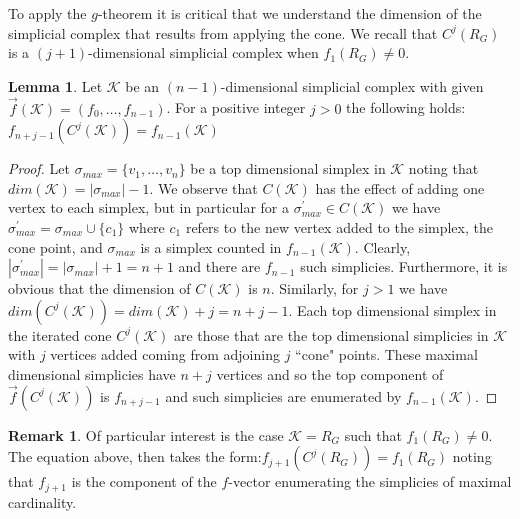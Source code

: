 \documentclass[oneside,12pt]{amsart}
\theoremstyle{definition}
\newtheorem{Lemma}[Theorem]{Lemma}
\newtheorem{Remark}[Theorem]{Remark}
\numberwithin{equation}{section}
\begin{document}
To apply the $g$-theorem it is critical that we understand the dimension of the simplicial complex that results from applying the cone.  We recall that $C^j(R_G)$ is a $(j+1)$-dimensional simplicial complex when $f_1(R_G) \neq 0$.


\begin{Lemma}\label{f vector cone}
Let $\mathcal{K}$ be an $(n-1)$-dimensional simplicial complex with given $\overrightarrow{f}(\mathcal{K}) = (f_0,\ldots,f_{n-1})$.  For a positive integer $j > 0$ the following holds: $f_{n+j -1}(C^j(\mathcal{K})) = f_{n-1}(\mathcal{K})$\\
\end{Lemma}


\begin{proof}
Let $\sigma_{max} = \{v_1,\ldots,v_n\}$ be a top dimensional simplex in $\mathcal{K}$ noting that $dim(\mathcal{K}) = |  \sigma_{max} | -1$.    We observe that $C(\mathcal{K})$ has the effect of adding one vertex to each simplex, but in particular for a $\sigma_{max}^{'} \in C(\mathcal{K})$ we have $\sigma_{max}^{'} = \sigma_{max} \cup \{c_1\}$ where $c_1$ refers to the new vertex added to the simplex, the cone point, and $\sigma_{max}$ is a simplex counted in $f_{n-1}(\mathcal{K})$.  Clearly, $| \sigma_{max}^{'}|  = |\sigma_{max}| + 1 = n+1$ and there are $f_{n-1}$ such simplicies.  Furthermore, it is obvious that the dimension of $C(\mathcal{K})$ is $n$.  Similarly, for $j >1$ we have $dim(C^j(\mathcal{K})) = dim(\mathcal{K}) + j = n + j -1$.  Each top dimensional simplex in the iterated cone $C^j(\mathcal{K})$ are those that are the top dimensional simplicies in $\mathcal{K}$ with $j$ vertices added coming from adjoining $j$ ``cone" points.  These maximal dimensional simplicies have $n+j$ vertices and so the top component of $\overrightarrow{f}(C^j(\mathcal{K}))$ is $f_{n+j-1}$ and such simplicies are enumerated by $f_{n-1}(\mathcal{K})$.
\end{proof}

\begin{Remark}
 Of particular interest is the case $\mathcal{K} = R_G$ such that $f_1(R_G) \neq 0$.  The equation above, then takes the form:$f_{j+1}(C^j(R_G)) = f_1(R_G)$ noting that $f_{j+1}$ is the component of the $f$-vector enumerating the simplicies of maximal cardinality.
\end{Remark}
\end{document}
